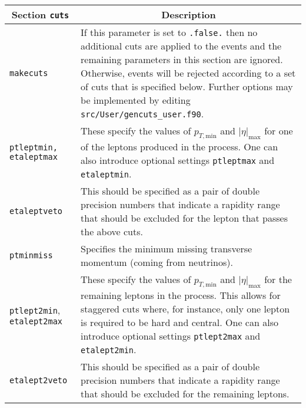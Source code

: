 	\begin{longtable}{p{1.5cm}p{12cm}}
		\toprule
		\multicolumn{1}{c}{{\textbf{Section} \texttt{cuts}}} & \multicolumn{1}{c}{{\textbf{Description}}} \\ 
		\midrule
		\texttt{makecuts} &
		If this parameter is set to {\tt .false.} then
		no additional cuts are applied to the events and the remaining
		parameters in this section are ignored. Otherwise, events will
		be rejected according to a set of cuts that is specified below.
		Further options may be implemented by editing {\tt src/User/gencuts\_user.f90}. \\
		
		{\tt ptleptmin, etaleptmax} & These specify the values
		of $p_{T,{\mathrm{min}}}$ and $|\eta|_{\mathrm{max}}$ for one of the leptons produced
		in the process. One can also introduce optional settings \texttt{ptleptmax}
		and \texttt{etaleptmin}. \\
		
		{\tt etaleptveto} & This should be specified as a pair of double
		precision numbers that indicate a rapidity range that should be excluded
		for the lepton that passes the above cuts. \\
		
		{\tt ptminmiss} & Specifies the minimum missing transverse
		momentum (coming from neutrinos). \\
		
		{\tt ptlept2min}, \texttt{etalept2max} & These specify
		the values of $p_{T,{\mathrm{min}}}$ and $|\eta|_{\mathrm{max}}$ for the remaining
		leptons in the process. This allows for staggered cuts where, for
		instance, only one lepton is required to be hard and central.
		One can also introduce optional settings \texttt{ptlept2max} and
		\texttt{etalept2min}. \\
		
		{\tt etalept2veto} & This should be specified as a pair of double
		precision numbers that indicate a rapidity range that should be excluded
		for the remaining leptons. \\
		
		\bottomrule
	\end{longtable}
\clearpage
